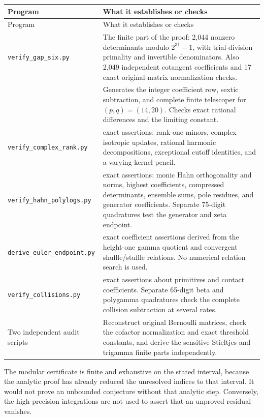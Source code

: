 \documentclass[11pt,a4paper]{article}
\theoremstyle{definition}
\theoremstyle{remark}
\numberwithin{equation}{section}
\begin{document}
\begin{longtable}{@{}>{\raggedright\arraybackslash}p{}
 >{\raggedright\arraybackslash}p{}@{}}
\toprule
Program & What it establishes or checks\\
\midrule
\endfirsthead
\toprule
Program & What it establishes or checks\\
\midrule
\endhead
\texttt{verify\_gap\_six.py} &
The finite part of the proof: 2,044 nonzero determinants modulo
$2^{31}-1$, with trial-division primality and invertible
denominators. Also 2,049 independent cotangent coefficients
and 17 exact original-matrix normalization checks.\\[7pt]
{\small\texttt{create\_gap\_six\_example.py}} &
Generates the integer coefficient row, sextic subtraction,
and complete finite telescoper for $(p,q)=(14,20)$.
Checks exact rational differences and the limiting constant.\\[7pt]
\texttt{verify\_complex\_rank.py} &
66 exact assertions: rank-one minors, complex isotropic
updates, rational harmonic decompositions, exceptional cutoff
identities, and a varying-kernel pencil.\\[7pt]
\texttt{verify\_hahn\_polylogs.py} &
149 exact assertions: monic Hahn orthogonality and norms,
highest coefficients, compressed determinants, ensemble sums,
pole residues, and generator coefficients. Separate
75-digit quadratures test the generator and zeta endpoint.\\[7pt]
\texttt{derive\_euler\_endpoint.py} &
21 exact coefficient assertions derived from the height-one
gamma quotient and convergent shuffle/stuffle relations.
No numerical relation search is used.\\[7pt]
\texttt{verify\_collisions.py} &
119 exact assertions about primitives and contact coefficients.
Separate 65-digit beta and polygamma quadratures check the
complete collision subtraction at several rates.\\[7pt]
Two independent audit scripts &
Reconstruct original Bernoulli matrices, check the cofactor
normalization and exact threshold constants, and derive the
sensitive Stieltjes and trigamma finite parts independently.\\
\bottomrule
\end{longtable}

The modular certificate is finite and exhaustive on the stated
interval, because the analytic proof has already reduced the
unresolved indices to that interval. It would not prove an
unbounded conjecture without that analytic step. Conversely,
the high-precision integrations are not used to assert that an
unproved residual vanishes.
\end{document}

